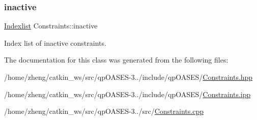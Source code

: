 \subsubsection{\texorpdfstring{inactive}{inactive}}
{\footnotesize\ttfamily \hyperlink{class_indexlist}{Indexlist} Constraints\+::inactive\hspace{0.3cm}{\ttfamily [protected]}}

Index list of inactive constraints. 

The documentation for this class was generated from the following files\+:\begin{DoxyCompactItemize}
\item 
/home/zheng/catkin\+\_\+ws/src/qp\+O\+A\+S\+E\+S-\/3../include/qp\+O\+A\+S\+E\+S/\hyperlink{_constraints_8hpp}{Constraints.\+hpp}\item 
/home/zheng/catkin\+\_\+ws/src/qp\+O\+A\+S\+E\+S-\/3../include/qp\+O\+A\+S\+E\+S/\hyperlink{_constraints_8ipp}{Constraints.\+ipp}\item 
/home/zheng/catkin\+\_\+ws/src/qp\+O\+A\+S\+E\+S-\/3../src/\hyperlink{_constraints_8cpp}{Constraints.\+cpp}\end{DoxyCompactItemize}

